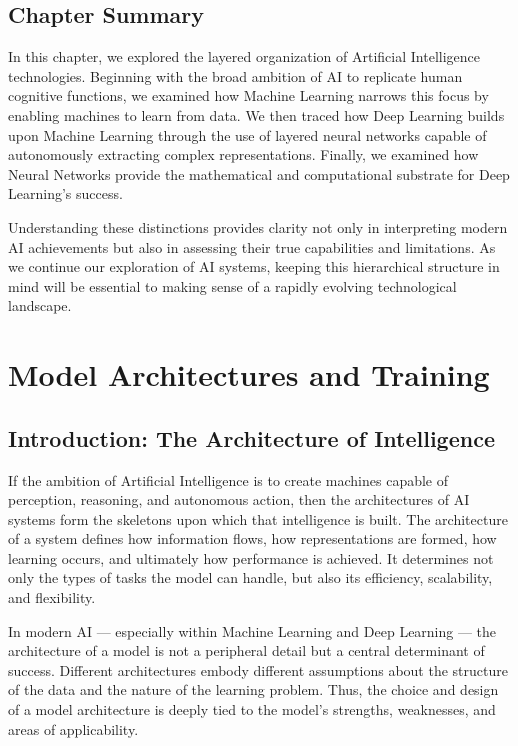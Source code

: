 \documentclass{book}
\begin{document}
\section{Chapter Summary}

In this chapter, we explored the layered organization of Artificial Intelligence
technologies. Beginning with the broad ambition of AI to replicate human 
cognitive functions, we examined how Machine Learning narrows this focus by 
enabling machines to learn from data. We then traced how Deep Learning builds 
upon Machine Learning through the use of layered neural networks capable of 
autonomously extracting complex representations. Finally, we examined how 
Neural Networks provide the mathematical and computational substrate for Deep 
Learning's success.

Understanding these distinctions provides clarity not only in interpreting 
modern AI achievements but also in assessing their true capabilities and 
limitations. As we continue our exploration of AI systems, keeping this 
hierarchical structure in mind will be essential to making sense of a 
rapidly evolving technological landscape.

\chapter{Model Architectures and Training}

\section{Introduction: The Architecture of Intelligence}

If the ambition of Artificial Intelligence is to create machines capable of 
perception, reasoning, and autonomous action, then the architectures of AI 
systems form the skeletons upon which that intelligence is built. The 
architecture of a system defines how information flows, how representations are 
formed, how learning occurs, and ultimately how performance is achieved. It 
determines not only the types of tasks the model can handle, but also its 
efficiency, scalability, and flexibility.

In modern AI — especially within Machine Learning and Deep Learning — the 
architecture of a model is not a peripheral detail but a central determinant of 
success. Different architectures embody different assumptions about the 
structure of the data and the nature of the learning problem. Thus, the choice 
and design of a model architecture is deeply tied to the model's strengths, 
weaknesses, and areas of applicability.
\end{document}
